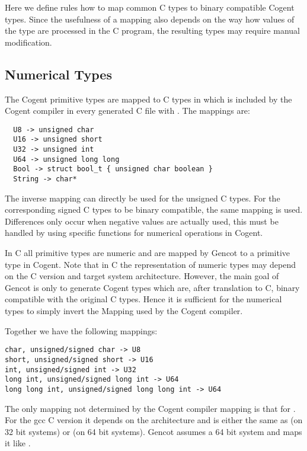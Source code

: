
Here we define rules how to map common C types to binary compatible Cogent types. Since the usefulness of a mapping
also depends on the way how values of the type are processed in the C program, the resulting types may require manual 
modification.

\subsection{Numerical Types}
\label{design-types-prim}

The Cogent primitive types are mapped to C types in  which is included by the Cogent compiler
in every generated C file with . The mappings are: 
\begin{verbatim}
  U8 -> unsigned char
  U16 -> unsigned short 
  U32 -> unsigned int
  U64 -> unsigned long long
  Bool -> struct bool_t { unsigned char boolean }
  String -> char*
\end{verbatim}
The inverse mapping can directly be used for the unsigned C types. For the corresponding signed C types to be binary
compatible, the same mapping is used. Differences only occur when negative values are actually used, this must be handled by using specific functions for numerical operations in Cogent.

In C all primitive types are numeric and are mapped by Gencot to a primitive type in Cogent. Note that in C the representation 
of numeric types may depend on the C version and target system architecture. However, the main goal of Gencot is only to generate
Cogent types which are, after translation to C, binary compatible with the original C types. Hence it is sufficient for the numerical 
types to simply invert the Mapping used by the Cogent compiler.

Together we have the following mappings:
\begin{verbatim}
char, unsigned/signed char -> U8
short, unsigned/signed short -> U16
int, unsigned/signed int -> U32
long int, unsigned/signed long int -> U64
long long int, unsigned/signed long long int -> U64
\end{verbatim}

The only mapping not determined by the Cogent compiler mapping is that for . For the gcc C version 
it depends on the architecture and is either the same as  (on 32 bit systems) or 
(on 64 bit systems). Gencot assumes a 64 bit system and maps it like .

